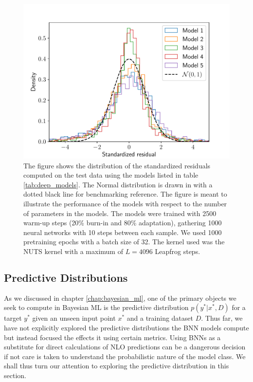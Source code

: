 \begin{figure}[h!]
    \centering
    \includegraphics[scale=0.7]{figures/standardized_residuals/standardized_residual_simple_models.pdf}
    \caption{
        The figure shows the distribution of the standardized residuals computed on the test data using the models listed in table \ref{tab:deep_models}. The Normal distribution is drawn in with a dotted black line for benchmarking reference.
        The figure is meant to illustrate the performance of the models with respect to the number of parameters in the models.
        The models were trained with 2500 warm-up steps (20\% burn-in and 80\% adaptation), gathering 1000 neural networks with 10 steps between each sample. We used 1000 pretraining epochs with a batch size of 32. The kernel used was the NUTS kernel with a maximum of $L = 4096$ Leapfrog steps. 
    }
    \label{fig:standardized_residual_vs_params}
\end{figure}

\subsection{Predictive Distributions}
As we discussed in chapter \ref{chap:bayesian_ml}, one of the primary objects we seek to compute
in Bayesian ML is the predictive distribution $p(y^*|x^*, D)$ for a target $y^*$ given an unseen input point $x^*$ and
a training dataset $D$. Thus far, we have not explicitly explored the predictive distributions the BNN models compute but instead focused the effects it using certain metrics. Using BNNs as a substitute for direct calculations of NLO predictions can be a dangerous decision if not care is taken to understand the probabilistic nature of the model class. We shall thus turn our attention to exploring the predictive distribution in this section.

